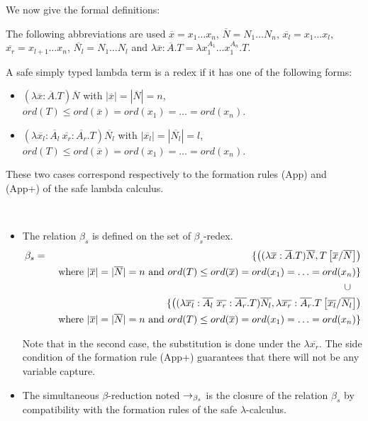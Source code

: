 We now give the formal definitions:

The following abbreviations are used $\overline{x} = x_1 \ldots
x_n$, $\overline{N} = N_1 \ldots N_n$, $\overline{x_l} = x_1 \ldots
x_l$, $\overline{x_r} = x_{l+1} \ldots x_n$, $\overline{N_l} = N_1
\ldots N_l$ and $\lambda \overline{x} : \overline{A} . T = \lambda
x_1^{A_1} \ldots x_1^{A_n} . T$.

\begin{dfn}
A safe simply typed lambda term is a redex if it has one of the
following forms:
\begin{itemize}
\item $(\lambda \overline{x} : \overline{A} . T) \overline{N}$
\quad with $|\overline{x}| = |\overline{N}| = n$, $ord(T) \leq
ord(\overline{x}) = ord(x_1) = \ldots = ord(x_n)$.

\item $(\lambda \overline{x_l} : \overline{A_l} \ \overline{x_r}: \overline{A_r} . T) \overline{N_l}$
\quad with $|\overline{x_l}| = |\overline{N_l}| = l$, $ord(T) \leq
ord(\overline{x}) = ord(x_1) = \ldots = ord(x_n)$.
\end{itemize}

These two cases correspond respectively to the formation rules (App)
and (App+) of the safe lambda calculus.

\end{dfn}

\begin{dfn} \
\begin{itemize}
\item The relation $\beta_s$ is defined on the set of $\beta_s$-redex.
\begin{eqnarray*}
\beta_s &=&
 \{  \left( (\lambda \overline{x} : \overline{A} . T) \overline{N}, T\left[ \overline{x}/\overline{N} \right] \right) \\
&& \mbox{ where }
     |\overline{x}| = |\overline{N}| = n \mbox{ and } ord(T) \leq ord(\overline{x}) = ord(x_1) = \ldots = ord(x_n)
\} \\
 && \cup \quad \\
&& \{
    \left( (\lambda \overline{x_l} : \overline{A_l} \  \overline{x_r}: \overline{A_r} . T) \overline{N_l}, \lambda \overline{x_r}: \overline{A_r} . T\left[ \overline{x_l}/\overline{N_l} \right] \right) \\
&& \mbox{ where }
 |\overline{x}| = |\overline{N}| = n \mbox{ and } ord(T) \leq ord(\overline{x}) = ord(x_1) = \ldots = ord(x_n)
\}
\end{eqnarray*}

Note that in the second case, the substitution is done under the
$\lambda \overline{x_r}$. The side condition of the formation rule
(App+) guarantees that there will not be any variable capture.

\item
The simultaneous $\beta$-reduction noted $\rightarrow_{\beta_s}$ is the closure
of the relation $\beta_s$ by compatibility with the formation rules
of the safe $\lambda$-calculus.
\end{itemize}
\end{dfn}

